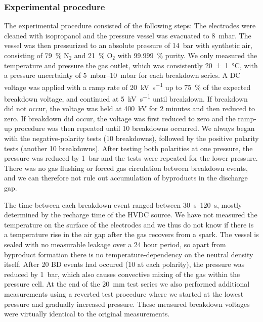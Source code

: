 \documentclass{iopjournal}
\providecommand\Ntwo{\ensuremath{\textrm{N}_2}}
\providecommand\Otwo{\ensuremath{\textrm{O}_2}}
\begin{document}
\subsubsection{Experimental procedure}
The experimental procedure consisted of the following steps:
The electrodes were cleaned with isopropanol and the pressure vessel was evacuated to \SI{8}{\milli\bar}.
The vessel was then pressurized to an absolute pressure of \SI{14}{\bar} with synthetic air, consisting of \SI{79}{\percent} $\Ntwo$ and \SI{21}{\percent} $\Otwo$ with \SI{99.999}{\percent} purity.
We only measured the temperature and pressure the gas outlet, which was consistently \SI{20(1)}{\celsius}, with a pressure uncertainty of \SIrange{5}{10}{\milli\bar} for each breakdown series.
A DC voltage was applied with a ramp rate of \SI[per-mode=symbol]{20}{\kilo\volt\per\second} up to \SI{75}{\percent} of the expected breakdown voltage, and continued at \SI[per-mode=symbol]{5}{\kilo\volt\per\second} until breakdown.
If breakdown did not occur, the voltage was held at \SI{400}{\kilo\volt} for 2 minutes and then reduced to zero.
If breakdown did occur, the voltage was first reduced to zero and the ramp-up procedure was then repeated until 10 breakdowns occurred.
We always began with the negative-polarity tests (10 breakdowns), followed by the positive polarity tests (another 10 breakdowns).
After testing both polarities at one pressure, the pressure was reduced by \SI{1}{\bar} and the tests were repeated for the lower pressure.
There was no gas flushing or forced gas circulation between breakdown events, and we can therefore not rule out accumulation of byproducts in the discharge gap.

The time between each breakdown event ranged between \SIrange{30}{120}{\second}, mostly determined by the recharge time of the HVDC source.
We have not measured the temperature on the surface of the electrodes and we thus do not know if there is a temperature rise in the air gap after the gas recovers from a spark.
The vessel is sealed with no measurable leakage over a 24 hour period, so apart from byproduct formation there is no temperature-dependency on the neutral density itself.
After 20 BD events had occured (10 at each polarity), the pressure was reduced by \SI{1}{\bar}, which also causes convective mixing of the gas within the pressure cell.
At the end of the \SI{20}{\milli\meter} test series we also performed additional measurements using a reverted test procedure where we started at the lowest pressure and gradually increased pressure.
These measured breakdown voltages were virtually identical to the original measurements.
\end{document}
